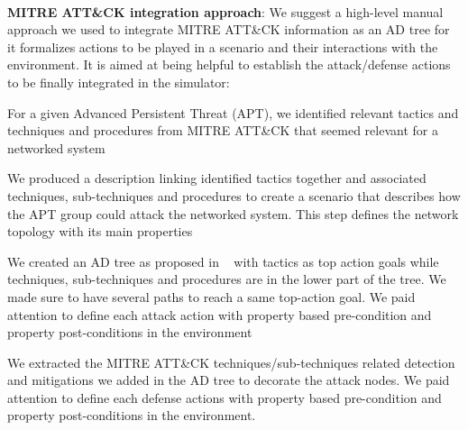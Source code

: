 \

\noindent
\textbf{MITRE ATT\&CK integration approach}: We suggest a high-level manual approach we used to integrate MITRE ATT\&CK information as an AD tree for it formalizes actions to be played in a scenario and their interactions with the environment. It is aimed at being helpful to establish the attack/defense actions to be finally integrated in the simulator:
\begin{enumerate*}[label=\arabic*),itemjoin={;\quad}]

    \item For a given Advanced Persistent Threat (APT), we identified relevant tactics and techniques and procedures from MITRE ATT\&CK that seemed relevant for a networked system
    
    \item We produced a description linking identified tactics together and associated techniques, sub-techniques and procedures to create a scenario that describes how the APT group could attack the networked system. This step defines the network topology with its main properties

    \item We created an AD tree as proposed in ~\cite{BKordy2010} with tactics as top action goals while techniques, sub-techniques and procedures are in the lower part of the tree. We made sure to have several paths to reach a same top-action goal. We paid attention to define each attack action with property based pre-condition and property post-conditions in the environment

    \item We extracted the MITRE ATT\&CK techniques/sub-techniques related detection and mitigations we added in the AD tree to decorate the attack nodes. We paid attention to define each defense actions with property based pre-condition and property post-conditions in the environment.




\end{enumerate*}
